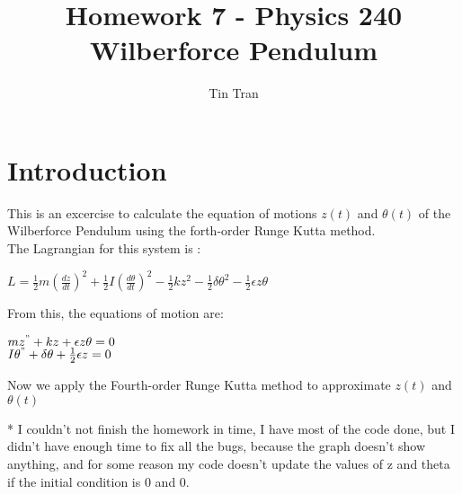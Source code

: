 \documentclass{article}
\begin{document}
\title{Homework 7 - Physics 240\\
		Wilberforce Pendulum}
\author{Tin Tran}

\maketitle

\section{Introduction}
This is an excercise to calculate the equation of motions $z(t)$ and $\theta(t)$ of the Wilberforce Pendulum using the forth-order Runge Kutta method.\\
\indent The Lagrangian for this system is : \\
\begin{center} $L = \frac{1}{2}m(\frac{dz}{dt})^2 + \frac{1}{2}I(\frac{d\theta}{dt})^2 - \frac{1}{2}kz^2 - \frac{1}{2}\delta\theta^2 - \frac{1}{2}\epsilon z\theta$\\
\end{center}
From this, the equations of motion are:
\begin{center}
$mz^" + kz + \epsilon z\theta = 0$\\
$I\theta^" + \delta\theta + \frac{1}{2}\epsilon z = 0$
\end{center}
Now we apply the Fourth-order Runge Kutta method to approximate $z(t)$ and $\theta(t)$

\noindent ** I couldn't not finish the homework in time, I have most of the code done, but I didn't have enough time to fix all the bugs, because the graph doesn't show anything, and for some reason my code doesn't update the values of z and theta if the initial condition is 0 and 0.
\end{document}
